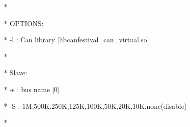 \documentclass[a4paper,12pt]{book}
\begin{document}
{\ttfamily
*
\space \space \space \space \space \space \space \space \space \space \space \space \space \space \space \space \space \space \space \space \space \space \space \space \space \space \space \space \space \space \space \space \space \space \space \space \space \space \space \space \space \space \space \space \space \space \space \space \space \space \space \space \space \space \space \space \space \space \space *}

{\ttfamily
* \space \space OPTIONS:
\space \space \space \space \space \space \space \space \space \space \space \space \space \space \space \space \space \space \space \space \space \space \space \space \space \space \space \space \space \space \space \space \space \space \space \space \space \space \space \space \space \space \space \space \space \space \space \space *}

{\ttfamily
* \space \space \space \space {}-l : Can library
[{\textquotedbl}libcanfestival\_can\_virtual.so{\textquotedbl}]
\space \space \space \space *}

{\ttfamily
*
\space \space \space \space \space \space \space \space \space \space \space \space \space \space \space \space \space \space \space \space \space \space \space \space \space \space \space \space \space \space \space \space \space \space \space \space \space \space \space \space \space \space \space \space \space \space \space \space \space \space \space \space \space \space \space \space \space \space \space *}

{\ttfamily
* \space \space \space Slave:
\space \space \space \space \space \space \space \space \space \space \space \space \space \space \space \space \space \space \space \space \space \space \space \space \space \space \space \space \space \space \space \space \space \space \space \space \space \space \space \space \space \space \space \space \space \space \space \space \space *}

{\ttfamily
* \space \space \space \space {}-s : bus name [{\textquotedbl}0{\textquotedbl}]
\space \space \space \space \space \space \space \space \space \space \space \space \space \space \space \space \space \space \space \space \space \space \space \space \space \space \space \space \space \space \space \space \space \space \space *}

{\ttfamily
* \space \space \space \space {}-S : 1M,500K,250K,125K,100K,50K,20K,10K,none(disable) \space *}

{\ttfamily
*
\space \space \space \space \space \space \space \space \space \space \space \space \space \space \space \space \space \space \space \space \space \space \space \space \space \space \space \space \space \space \space \space \space \space \space \space \space \space \space \space \space \space \space \space \space \space \space \space \space \space \space \space \space \space \space \space \space \space \space *}
\end{document}
